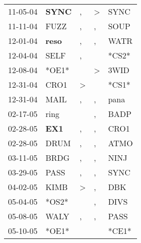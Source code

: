 \begin{supertabular}{p{0.07\textwidth}p{0.06\textwidth}p{0.02\textwidth}p{0.02\textwidth}p{0.06\textwidth}}
 11-05-04\textsuperscript{} &  \textbf{SYNC\textsuperscript{}} &             , &  \textgreater &           SYNC\textsuperscript{} \\
 11-11-04\textsuperscript{} &           FUZZ\textsuperscript{} &             , &             , &           SOUP\textsuperscript{} \\
 12-01-04\textsuperscript{} &  \textbf{reso\textsuperscript{}} &             , &             , &           WATR\textsuperscript{} \\
 12-04-04\textsuperscript{} &           SELF\textsuperscript{} &             , &               &                            *CS2* \\
 12-08-04\textsuperscript{} &                            *OE1* &               &  \textgreater &           3WID\textsuperscript{} \\
 12-31-04\textsuperscript{} &           CRO1\textsuperscript{} &  \textgreater &               &                            *CS1* \\
 12-31-04\textsuperscript{} &           MAIL\textsuperscript{} &             , &             , &           pana\textsuperscript{} \\
 02-17-05\textsuperscript{} &           ring\textsuperscript{} &               &             , &           BADP\textsuperscript{} \\
 02-28-05\textsuperscript{} &   \textbf{EX1\textsuperscript{}} &             , &             , &           CRO1\textsuperscript{} \\
 02-28-05\textsuperscript{} &           DRUM\textsuperscript{} &             , &             , &           ATMO\textsuperscript{} \\
 03-11-05\textsuperscript{} &           BRDG\textsuperscript{} &             , &             , &           NINJ\textsuperscript{} \\
 03-29-05\textsuperscript{} &           PASS\textsuperscript{} &             , &             , &           SYNC\textsuperscript{} \\
 04-02-05\textsuperscript{} &           KIMB\textsuperscript{} &  \textgreater &             , &            DBK\textsuperscript{} \\
 05-04-05\textsuperscript{} &                            *OS2* &               &             , &           DIVS\textsuperscript{} \\
 05-08-05\textsuperscript{} &           WALY\textsuperscript{} &             , &             , &           PASS\textsuperscript{} \\
 05-10-05\textsuperscript{} &                            *OE1* &               &               &                            *CE1* \\

\end{supertabular}

